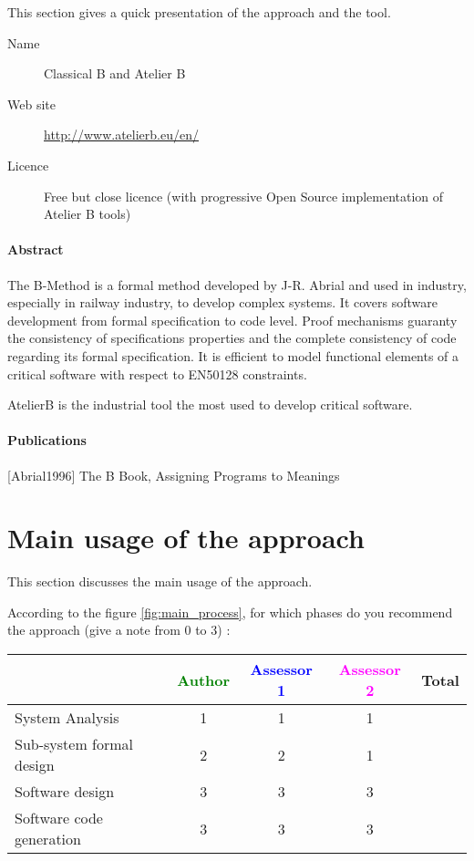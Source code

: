 This section gives a quick presentation of the approach and the tool.

\begin{description}
\item[Name] Classical B and Atelier B
\item[Web site] \url{http://www.atelierb.eu/en/}
\item[Licence] Free but close licence (with progressive Open Source implementation of Atelier B tools)
\end{description}

\paragraph{Abstract} 

The B-Method is a formal method developed by J-R. Abrial and used in industry, especially in railway industry, to develop complex systems. It covers software development from formal specification to code level. Proof mechanisms guaranty the consistency of specifications properties and the complete consistency of code regarding its formal specification. It is efficient to model  functional  elements of a critical software with respect to  EN50128 constraints.

AtelierB is the industrial  tool the most used to develop critical software.

\paragraph{Publications} 
[Abrial1996] The B Book, Assigning Programs to Meanings


\section{Main usage of the approach}
\label{main_usage}
This section discusses the main usage of the approach.

According to the figure \ref{fig:main_process}, for which phases do you recommend the approach (give a note from 0 to  3) :

\begin{tabular}{|l | c | c | c | c|}
\hline
& \textcolor{green}{Author} & \textcolor{blue}{Assessor 1} & \textcolor{magenta}{Assessor 2} & Total \\
\hline 
System Analysis & 1 & 1 & 1 &  \\
\hline
Sub-system formal design & 2 & 2 & 1 & \\
\hline
Software design & 3 & 3 & 3 & \\
\hline
Software code generation & 3 & 3 & 3 & \\
\hline
\end{tabular}

